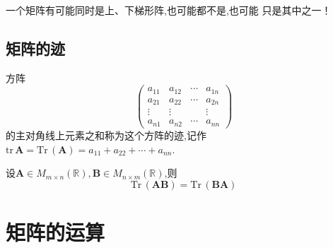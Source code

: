 \begin{red}
\begin{remark}
    一个矩阵有可能同时是上、下梯形阵,也可能都不是,也可能
只是其中之一！
\end{remark}
\end{red}
\subsection{矩阵的迹}
\begin{formal}
\begin{definition}[迹]\label{def:迹}
方阵
\[
\begin{pmatrix}
       a_{11} &a_{12}&\cdots&a_{1n}\\
         a_{21} &a_{22}&\cdots&a_{2n}\\
            \vdots&\vdots&&\vdots\\
            a_{n1}&a_{n2}&\cdots&a_{nn} 
\end{pmatrix}
\]
的主对角线上元素之和称为这个方阵的迹,记作$ \mathrm{tr}\,\bm{A}=\mathrm{Tr}\,\left(\bm{A}\right)=
  a_{11} + a_{22} + \cdots + a_{nn}$.
\end{definition}
\end{formal}
\begin{formal}
    \begin{theorem}[迹的交换性]\label{thm:迹的交换性}
        设$\bm{A}\in M_{m\times n}\left(\mathbb{R}\right),\bm{B}\in M_{n\times m}\left(\mathbb{R}\right)$,则\[
        \mathrm{Tr}\,\left(\bm{AB}\right)=\mathrm{Tr}\,\left(\bm{BA}\right)
        \]
    \end{theorem}
\end{formal}
\newpage 
\section{矩阵的运算}
